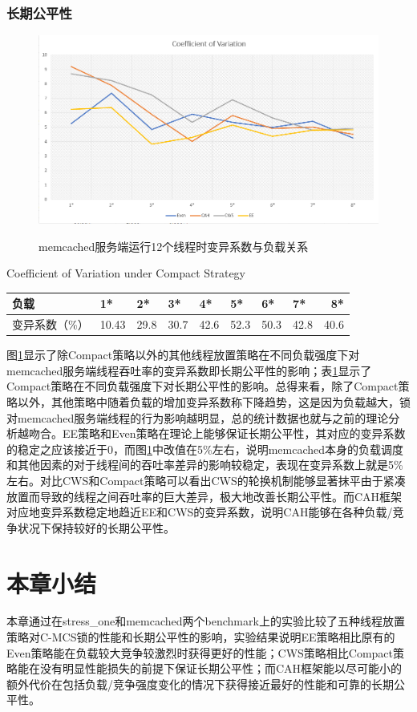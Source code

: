 \subsubsection{长期公平性}
\begin{figure}[t]
	\centering
	\includegraphics[width=5.6in]{figure/memcached-cv.PNG}
	\caption{memcached服务端运行12个线程时变异系数与负载关系}{}
	\label{Fig:memcached-thrpt}
\end{figure}

\begin{table}[!hpb]
  \centering
    {Coefficient of Variation under Compact Strategy}
  \label{tab:CV-Compact}
  \begin{tabular}{@{}llllllllr@{}} \toprule
    负载 & 1* & 2* & 3* & 4* & 5* & 6* & 7* & 8*\\ \midrule
    变异系数（\%）	&10.43	&29.8	& 30.7	& 42.6	& 52.3 &50.3 &42.8 &40.6 \\
  \end{tabular}
\end{table}

图\ref{Fig:memcached-thrpt}显示了除Compact策略以外的其他线程放置策略在不同负载强度下对memcached服务端线程吞吐率的变异系数即长期公平性的影响；表\ref{tab:CV-Compact}显示了Compact策略在不同负载强度下对长期公平性的影响。总得来看，除了Compact策略以外，其他策略中随着负载的增加变异系数称下降趋势，这是因为负载越大，锁对memcached服务端线程的行为影响越明显，总的统计数据也就与之前的理论分析越吻合。EE策略和Even策略在理论上能够保证长期公平性，其对应的变异系数的稳定之应该接近于0，而图\ref{Fig:memcached-thrpt}中改值在5\%左右，说明memcached本身的负载调度和其他因素的对于线程间的吞吐率差异的影响较稳定，表现在变异系数上就是5\%左右。对比CWS和Compact策略可以看出CWS的轮换机制能够显著抹平由于紧凑放置而导致的线程之间吞吐率的巨大差异，极大地改善长期公平性。而CAH框架对应地变异系数稳定地趋近EE和CWS的变异系数，说明CAH能够在各种负载/竞争状况下保持较好的长期公平性。
\section{本章小结}
本章通过在stress\_one和memcached两个benchmark上的实验比较了五种线程放置策略对C-MCS锁的性能和长期公平性的影响，实验结果说明EE策略相比原有的Even策略能在负载较大竞争较激烈时获得更好的性能；CWS策略相比Compact策略能在没有明显性能损失的前提下保证长期公平性；而CAH框架能以尽可能小的额外代价在包括负载/竞争强度变化的情况下获得接近最好的性能和可靠的长期公平性。